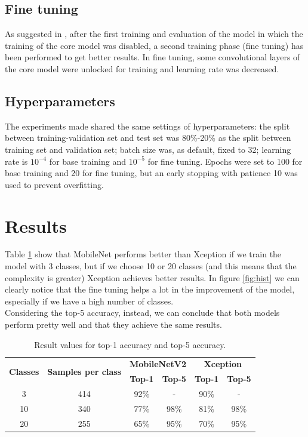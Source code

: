 \documentclass[12pt]{llncs}
\begin{document}
\subsection{Fine tuning}
As suggested in \cite{tf-transfer}, after the first training and evaluation of the model in which the training of the core model was disabled, a second training phase (fine tuning) has been performed to get better results. In fine tuning, some convolutional layers of the core model were unlocked for training and learning rate was decreased.

\subsection{Hyperparameters}
The experiments made shared the same settings of hyperparameters: the split between training-validation set and test set was 80\%-20\% as the split between training set and validation set; batch size was, as default, fixed to 32; learning rate is $10^{-4}$ for base training and $10^{-5}$ for fine tuning. Epochs were set to 100 for base training and 20 for fine tuning, but an early stopping with patience 10 was used to prevent overfitting.

\section{Results}
Table \ref{tab:accuracy} show that MobileNet performs better than Xception if we train the model with 3 classes, but if we choose 10 or 20 classes (and this means that the complexity is greater) Xception achieves better results. In figure \ref{fig:hist} we can clearly notice that the fine tuning helps a lot in the improvement of the model, especially if we have a high number of classes.\\
Considering the top-5 accuracy, instead, we can conclude that both models perform pretty well and that they achieve the same results.

\begin{table}[h]
\centering
\setlength{\tabcolsep}{5pt}
\def\arraystretch{1.2}
\begin{tabular}{ |c|c|c|c|c|c| } 
 \hline
 \multirow{2}{4em}{\textbf{Classes}} & \multirow{2}{6em}{\textbf{Samples per class}} & \multicolumn{2}{|c|}{\textbf{MobileNetV2}} & \multicolumn{2}{|c|}{\textbf{Xception}} \\ 
 \cline{3-6}
 & & \textbf{Top-1} & \textbf{Top-5} & \textbf{Top-1} & \textbf{Top-5} \\
 \hline 
 3 & 414 & 92\% & - & 90\% & - \\ 
 \hline 
 10 & 340 & 77\% & 98\% & 81\% & 98\% \\
 \hline 
 20 & 255 & 65\% & 95\% & 70\% & 95\% \\
 \hline
\end{tabular}
\caption{Result values for top-1 accuracy and top-5 accuracy.}
\label{tab:accuracy}
\end{table}
\end{document}
